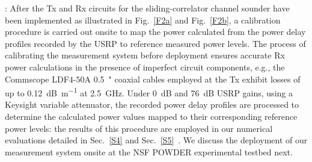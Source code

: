 \documentclass[12pt, draftcls, onecolumn]{IEEEtran}
\begin{document}
: After the Tx and Rx circuits for the sliding-correlator channel sounder have been implemented as illustrated in Fig.~\ref{F2a} and Fig.~\ref{F2b}, a calibration procedure is carried out onsite to map the power calculated from the power delay profiles recorded by the USRP to reference measured power levels. The process of calibrating the measurement system before deployment ensures accurate Rx power calculations in the presence of imperfect circuit components, e.g., the Commscope LDF$4$-$50$A \SI{0.5}{{"}} coaxial cables employed at the Tx exhibit losses of up to \SI{0.12}{\deci\bel\per\meter} at \SI{2.5}{\giga\hertz}. Under \SI{0}{\deci\bel} and \SI{76}{\deci\bel} USRP gains, using a Keysight variable attenuator, the recorded power delay profiles are processed to determine the calculated power values mapped to their corresponding reference power levels: the results of this procedure are employed in our numerical evaluations detailed in Sec.~\ref{S4} and Sec.~\ref{S5}~\cite{SPAVE_ICC}. We discuss the deployment of our measurement system onsite at the NSF POWDER experimental testbed next.
\end{document}
